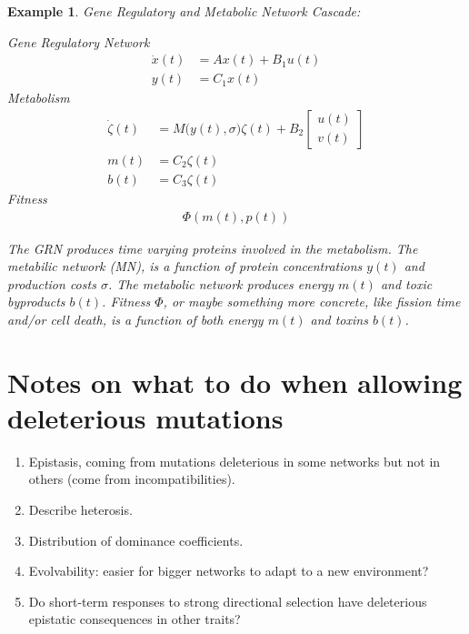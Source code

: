 \documentclass[11 pt]{article}
\newtheorem{example}{Example}
\begin{document}
  \begin{example} 
    Gene Regulatory and Metabolic Network Cascade:

    Gene Regulatory Network
    \begin{align*}
      \dot{x}(t) &= A x(t) + B_{1} u(t) \\
      y(t) &= C_{1} x(t)
    \end{align*}
      Metabolism
      \begin{align*}
      \dot{\zeta}(t) &= M\big(y(t), \sigma \big) \zeta(t) + B_{2} \begin{bmatrix} u(t) \\ v(t) \end{bmatrix} \\
        m(t) &= C_{2} \zeta(t) \\
      b(t) &= C_{3} \zeta(t)
      \end{align*}
      Fitness
      \begin{align*}
      \Phi(m(t), p(t))
    \end{align*}

    The GRN produces time varying proteins involved in the metabolism. The metabilic network (MN), is a function of protein concentrations $y(t)$ and production costs $\sigma$. The metabolic network produces energy $m(t)$ and toxic byproducts $b(t)$. Fitness $\Phi$, or maybe something more concrete, like fission time and/or cell death, is a function of both energy $m(t)$ and toxins $b(t)$. 
  \end{example}
\section{Notes on what to do when allowing deleterious mutations} 

\begin{enumerate}

    \item Epistasis, coming from mutations deleterious in some networks but not in others
(come from incompatibilities).

    \item Describe heterosis.

    \item Distribution of dominance coefficients.

    \item Evolvability: easier for bigger networks to adapt to a new environment?

    \item Do short-term responses to strong directional selection have deleterious epistatic consequences in other traits?

\end{enumerate}



\end{document}
